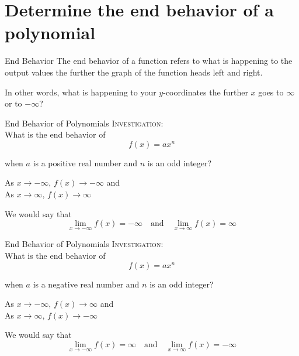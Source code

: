 \documentclass[t,usenames,dvipsnames]{beamer}
\begin{document}
\section{Determine the end behavior of a polynomial}

\begin{frame}{End Behavior}
The \alert{end behavior} of a function refers to what is happening to the output values the further the graph of the function heads left and right.  \newline\\ \pause

In other words, what is happening to your $y$-coordinates the further $x$ goes to $\infty$ or to $-\infty$?
\end{frame}

\begin{frame}{End Behavior of Polynomials}
\textsc{Investigation:} \newline\\
What is the end behavior of
\[
f(x) = ax^n
\]

when $a$ is a positive real number and $n$ is an odd integer?    \newline\\ \pause

As $x \to -\infty, \, f(x) \to -\infty$ and \\
As $x \to \infty, \, f(x) \to \infty$   \newline\\ \pause

We would say that
\[
\lim_{x \to -\infty} f(x) = -\infty \quad \text{and} \quad \lim_{x \to \infty} f(x) = \infty
\]
\end{frame}

\begin{frame}{End Behavior of Polynomials}
\textsc{Investigation:} \newline\\
What is the end behavior of
\[
f(x) = ax^n
\]

when $a$ is a negative real number and $n$ is an odd integer?    \newline\\ \pause

As $x \to -\infty, \, f(x) \to \infty$ and \\
As $x \to \infty, \, f(x) \to -\infty$   \newline\\ \pause

We would say that
\[
\lim_{x \to -\infty} f(x) = \infty \quad \text{and} \quad \lim_{x \to \infty} f(x) = -\infty
\]
\end{frame}
\end{document}

